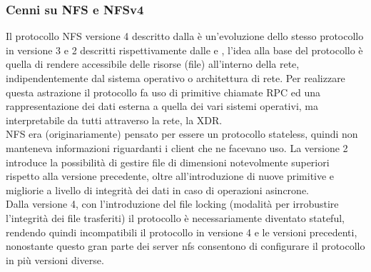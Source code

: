 \documentclass[a4paper]{article}
\begin{document}
\subsubsection{Cenni su NFS e NFSv4}
Il protocollo \Gls{NFS} versione 4 descritto dalla \cite[rfc7530]{rfc7530} è un'evoluzione dello stesso protocollo in versione 3 e 2 descritti
rispettivamente dalle \cite[rfc1813]{rfc1813} e \cite[rfc1094]{rfc1094}, l'idea alla base del protocollo è quella di rendere accessibile delle
risorse (file) all'interno della rete, indipendentemente dal sistema operativo o architettura di rete. Per realizzare questa astrazione il protocollo
fa uso di primitive chiamate \Gls{RPC} ed una rappresentazione dei dati esterna a quella dei vari sistemi operativi, ma interpretabile da tutti attraverso
la rete, la \Gls{XDR}.\\
NFS era (originariamente) pensato per essere un protocollo stateless, quindi non manteneva informazioni riguardanti i client che ne facevano uso. La versione 2 introduce la possibilità
di gestire file di dimensioni notevolmente superiori rispetto alla versione precedente, oltre all'introduzione di nuove primitive e migliorie a livello di
integrità dei dati in caso di operazioni asincrone.\\
Dalla versione 4, con l'introduzione del file locking (modalità per irrobustire l'integrità dei file trasferiti) il protocollo è necessariamente diventato stateful, rendendo quindi
incompatibili il protocollo in versione 4 e le versioni precedenti, nonostante questo gran parte dei server nfs consentono di configurare il protocollo in più versioni diverse. 
\end{document}
